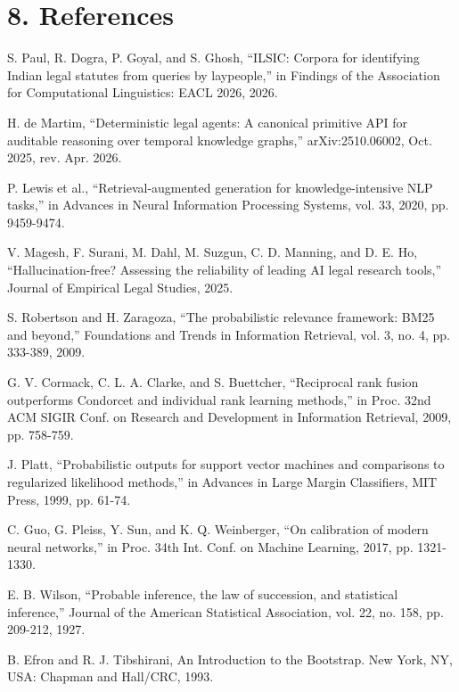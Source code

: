 \documentclass[12pt,a4paper]{article}
\begin{document}
\section*{8. References}
\begingroup{}\footnotesize
\begin{enumerate}[label={[\arabic*]},leftmargin=2.4em,itemsep=1pt]
  \item S. Paul, R. Dogra, P. Goyal, and S. Ghosh, ``ILSIC: Corpora for identifying Indian legal statutes from queries by laypeople,'' in Findings of the Association for Computational Linguistics: EACL 2026, 2026.
  \item H. de Martim, ``Deterministic legal agents: A canonical primitive API for auditable reasoning over temporal knowledge graphs,'' arXiv:2510.06002, Oct. 2025, rev. Apr. 2026.
  \item P. Lewis et al., ``Retrieval-augmented generation for knowledge-intensive NLP tasks,'' in Advances in Neural Information Processing Systems, vol. 33, 2020, pp. 9459-9474.
  \item V. Magesh, F. Surani, M. Dahl, M. Suzgun, C. D. Manning, and D. E. Ho, ``Hallucination-free? Assessing the reliability of leading AI legal research tools,'' Journal of Empirical Legal Studies, 2025.
  \item S. Robertson and H. Zaragoza, ``The probabilistic relevance framework: BM25 and beyond,'' Foundations and Trends in Information Retrieval, vol. 3, no. 4, pp. 333-389, 2009.
  \item G. V. Cormack, C. L. A. Clarke, and S. Buettcher, ``Reciprocal rank fusion outperforms Condorcet and individual rank learning methods,'' in Proc. 32nd ACM SIGIR Conf. on Research and Development in Information Retrieval, 2009, pp. 758-759.
  \item J. Platt, ``Probabilistic outputs for support vector machines and comparisons to regularized likelihood methods,'' in Advances in Large Margin Classifiers, MIT Press, 1999, pp. 61-74.
  \item C. Guo, G. Pleiss, Y. Sun, and K. Q. Weinberger, ``On calibration of modern neural networks,'' in Proc. 34th Int. Conf. on Machine Learning, 2017, pp. 1321-1330.
  \item E. B. Wilson, ``Probable inference, the law of succession, and statistical inference,'' Journal of the American Statistical Association, vol. 22, no. 158, pp. 209-212, 1927.
  \item B. Efron and R. J. Tibshirani, An Introduction to the Bootstrap. New York, NY, USA: Chapman and Hall/CRC, 1993.

\end{enumerate}
\end{document}
